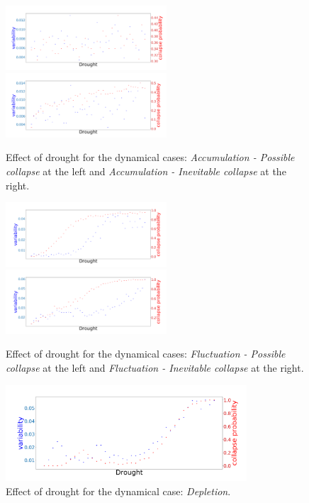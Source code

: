 \documentclass{article}
\begin{document}
\begin{figure}[h]
\begin{center}
\includegraphics[width=6cm]{results/drought/return_moderate.png}
\includegraphics[width=6cm]{results/drought/return_always.png}
\end{center}
\caption{\label{fig:temp}Effect of drought for the dynamical cases: \textit{Accumulation - Possible collapse} at the left and \textit{Accumulation - Inevitable collapse} at the right.
\label{fig:drought2}}
\end{figure}

\begin{figure}[h]
\begin{center}
\includegraphics[width=6cm]{results/drought/equivalent_moderate.png}
\includegraphics[width=6cm]{results/drought/equivalent_always.png}
\end{center}
\caption{\label{fig:temp}Effect of drought for the dynamical cases: \textit{Fluctuation - Possible collapse} at the left and \textit{Fluctuation - Inevitable collapse} at the right.
\label{fig:drought3}}
\end{figure}

\begin{figure}[h]
\begin{center}
\includegraphics[width=9cm]{results/drought/fuel_low.png}
\end{center}
\caption{\label{fig:temp}Effect of drought for the dynamical case: \textit{Depletion}. \label{fig:drought4}}
\end{figure}
\end{document}
